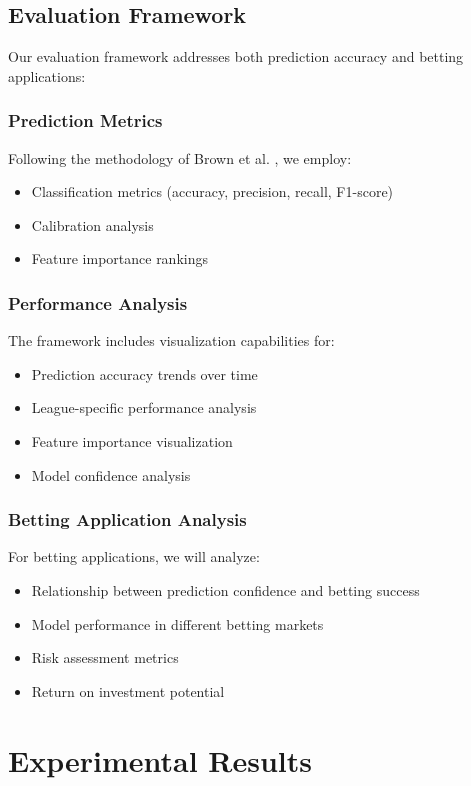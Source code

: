 \documentclass[conference]{IEEEtran}
\begin{document}
\subsection{Evaluation Framework}
Our evaluation framework addresses both prediction accuracy and betting applications:

\subsubsection{Prediction Metrics}
Following the methodology of Brown et al. \cite{brown2018machine}, we employ:
\begin{itemize}
\item Classification metrics (accuracy, precision, recall, F1-score)
\item Calibration analysis
\item Feature importance rankings
\end{itemize}

\subsubsection{Performance Analysis}
The framework includes visualization capabilities for:
\begin{itemize}
\item Prediction accuracy trends over time
\item League-specific performance analysis
\item Feature importance visualization
\item Model confidence analysis
\end{itemize}

\subsubsection{Betting Application Analysis}
For betting applications, we will analyze:
\begin{itemize}
\item Relationship between prediction confidence and betting success
\item Model performance in different betting markets
\item Risk assessment metrics
\item Return on investment potential
\end{itemize}

\section{Experimental Results}
\end{document}
